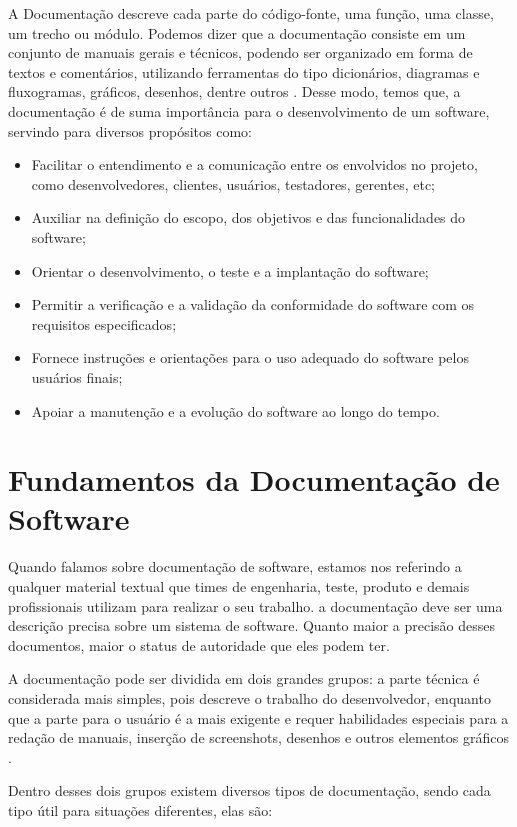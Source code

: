 \documentclass[12pt,oneside,a4paper,article]{abntex2}
\begin{document}
A Documentação descreve cada parte do código-fonte, uma função, uma classe, um trecho ou módulo. Podemos dizer que a documentação consiste em um conjunto de manuais gerais e técnicos, podendo ser organizado em forma de textos e comentários, utilizando ferramentas do tipo dicionários, diagramas e
fluxogramas, gráficos, desenhos, dentre outros \cite{coelho2009documentaccao}. Desse modo, temos que, a documentação é de suma importância para o desenvolvimento de um software, servindo para diversos propósitos
como:

\begin{itemize}
      \item Facilitar o entendimento e a comunicação entre os envolvidos no projeto, como desenvolvedores,
            clientes, usuários, testadores, gerentes, etc;
      \item Auxiliar na definição do escopo, dos objetivos e das funcionalidades do software;
      \item Orientar o desenvolvimento, o teste e a implantação do software;
      \item Permitir a verificação e a validação da conformidade do software com os requisitos especificados;
      \item Fornece instruções e orientações para o uso adequado do software pelos usuários finais;
      \item Apoiar a manutenção e a evolução do software ao longo do tempo.
\end{itemize}

\section{Fundamentos da Documentação de Software}
Quando falamos sobre documentação de software, estamos nos referindo a qualquer material textual que times de engenharia, teste, produto e demais profissionais utilizam para realizar o seu trabalho. a documentação deve ser uma descrição precisa sobre um sistema de software. Quanto maior a precisão desses documentos, maior o status de autoridade que eles podem ter.

A documentação pode ser dividida em dois grandes grupos: a parte técnica é considerada mais simples, pois descreve o trabalho do desenvolvedor, enquanto
que a parte para o usuário é a mais exigente e requer habilidades especiais para a redação de manuais, inserção de screenshots, desenhos e outros elementos
gráficos \cite{coelho2009documentaccao}.

Dentro desses dois grupos existem diversos tipos de documentação, sendo cada tipo útil para situações diferentes, elas são:
\end{document}

